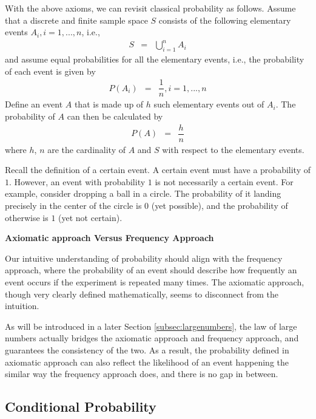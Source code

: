 With the above axioms, we can revisit classical probability as follows. Assume that a discrete and finite sample space $S$ consists of the following elementary events $A_i, i=1,...,n$, i.e.,
\begin{eqnarray}
  S &=& \bigcup_{i=1}^{n} A_i \nonumber
\end{eqnarray}
and assume equal probabilities for all the elementary events, i.e., the probability of each event is given by
\begin{eqnarray}
  P(A_i) &=& \dfrac{1}{n}, i=1,...,n \nonumber
\end{eqnarray}
Define an event $A$ that is made up of $h$ such elementary events out of $A_i$. The probability of $A$ can then be calculated by
\begin{eqnarray}
  P(A) &=& \dfrac{h}{n} \nonumber
\end{eqnarray}
where $h$, $n$ are the cardinality of $A$ and $S$ with respect to the elementary events.

Recall the definition of a certain event. A certain event must have a probability of $1$. However, an event with probability $1$ is not necessarily a certain event. For example, consider dropping a ball in a circle. The probability of it landing precisely in the center of the circle is $0$ (yet possible), and the probability of otherwise is $1$ (yet not certain).

\begin{mdframed}
\noindent \textbf{Axiomatic approach Versus Frequency Approach}

Our intuitive understanding of probability should align with the frequency approach, where the probability of an event should describe how frequently an event occurs if the experiment is repeated many times. The axiomatic approach, though very clearly defined mathematically, seems to disconnect from the intuition.

As will be introduced in a later Section \ref{subsec:largenumbers}, the law of large numbers actually bridges the axiomatic approach and frequency approach, and guarantees the consistency of the two. As a result, the probability defined in axiomatic approach can also reflect the likelihood of an event happening the similar way the frequency approach does, and there is no gap in between.

\end{mdframed}

\subsection{Conditional Probability}


